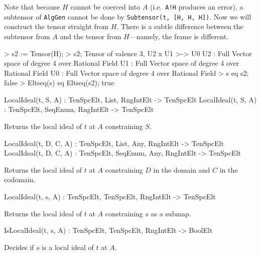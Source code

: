 \begin{example}[Subtensors]
Note that because $H$ cannot be coerced into $A$ (i.e.\ \texttt{A!H} produces an
error), a subtensor of \texttt{AlgGen} cannot be done by \texttt{Subtensor(t,
[H, H, H])}. Now we will construct the tensor straight from $H$. There is a
subtle difference between the subtensor from $A$ and the tensor from
$H$---namely, the frame is different.
\begin{code}
> s2 := Tensor(H);
> s2;
Tensor of valence 3, U2 x U1 >-> U0
U2 : Full Vector space of degree 4 over Rational Field
U1 : Full Vector space of degree 4 over Rational Field
U0 : Full Vector space of degree 4 over Rational Field
> s eq s2;
false
> Eltseq(s) eq Eltseq(s2);
true
\end{code}
\end{example}


\begin{intrinsics}
LocalIdeal(t, S, A) : TenSpcElt, List, {RngIntElt} -> TenSpcElt
LocalIdeal(t, S, A) : TenSpcElt, SeqEnum, {RngIntElt} -> TenSpcElt
\end{intrinsics}

Returns the local ideal of $t$ at $A$ constraining $S$.

\begin{intrinsics}
LocalIdeal(t, D, C, A) : TenSpcElt, List, Any, {RngIntElt} -> TenSpcElt
LocalIdeal(t, D, C, A) : TenSpcElt, SeqEnum, Any, {RngIntElt} -> TenSpcElt
\end{intrinsics}

Returns the local ideal of $t$ at $A$ constraining $D$ in the domain and $C$ 
in the codomain.

\begin{intrinsics}
LocalIdeal(t, s, A) : TenSpcElt, TenSpcElt, {RngIntElt} -> TenSpcElt
\end{intrinsics}

Returns the local ideal of $t$ at $A$ constraining $s$ as a submap.


\begin{intrinsics}
IsLocalIdeal(t, s, A) : TenSpcElt, TenSpcElt, {RngIntElt} -> BoolElt
\end{intrinsics}

Decides if $s$ is a local ideal of $t$ at $A$.

